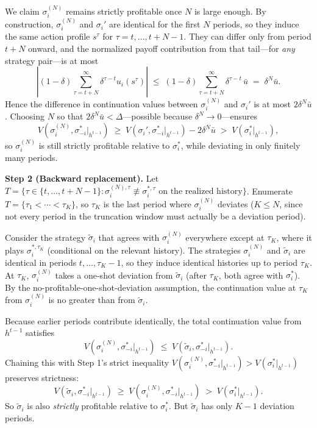 {\begin{center}
\end{center}

We claim $\sigma_i^{(N)}$ remains strictly profitable once $N$ is large enough. By construction, $\sigma_i^{(N)}$ and $\sigma_i'$ are identical for the first $N$ periods, so they induce the same action profile $s^\tau$ for $\tau = t, \ldots, t+N-1$. They can differ only from period $t+N$ onward, and the normalized payoff contribution from that tail---for \emph{any} strategy pair---is at most
\[
\left|(1-\delta)\sum_{\tau = t+N}^{\infty} \delta^{\tau - t} u_i(s^\tau)\right| \;\le\; (1-\delta)\sum_{\tau = t+N}^{\infty}\delta^{\tau-t}\,\bar u \;=\; \delta^N \bar u.
\]
Hence the difference in continuation values between $\sigma_i^{(N)}$ and $\sigma_i'$ is at most $2\delta^N \bar u$. Choosing $N$ so that $2\delta^N \bar u < \Delta$---possible because $\delta^N \to 0$---ensures
\[
V(\sigma_i^{(N)}, \sigma_{-i}^*|_{h^{t-1}}) \;\ge\; V(\sigma_i', \sigma_{-i}^*|_{h^{t-1}}) - 2\delta^N \bar u \;>\; V(\sigma_i^*|_{h^{t-1}}),
\]
so $\sigma_i^{(N)}$ is still strictly profitable relative to $\sigma_i^*$, while deviating in only finitely many periods.

\smallskip
\noindent\textbf{Step 2 (Backward replacement).} Let $T = \{\tau \in \{t, \ldots, t + N - 1\} : \sigma_i^{(N), \tau}\not\equiv \sigma_i^{*,\tau}\text{ on the realized history}\}$. Enumerate $T = \{\tau_1 < \cdots < \tau_K\}$, so $\tau_K$ is the last period where $\sigma_i^{(N)}$ deviates ($K \le N$, since not every period in the truncation window must actually be a deviation period).

Consider the strategy $\tilde\sigma_i$ that agrees with $\sigma_i^{(N)}$ everywhere except at $\tau_K$, where it plays $\sigma_i^{*, \tau_K}$ (conditional on the relevant history). The strategies $\sigma_i^{(N)}$ and $\tilde\sigma_i$ are identical in periods $t, \ldots, \tau_K - 1$, so they induce identical histories up to period $\tau_K$. At $\tau_K$, $\sigma_i^{(N)}$ takes a one-shot deviation from $\tilde\sigma_i$ (after $\tau_K$, both agree with $\sigma_i^*$). By the no-profitable-one-shot-deviation assumption, the continuation value at $\tau_K$ from $\sigma_i^{(N)}$ is no greater than from $\tilde\sigma_i$.

Because earlier periods contribute identically, the total continuation value from $h^{t-1}$ satisfies
\[
V(\sigma_i^{(N)}, \sigma_{-i}^*|_{h^{t-1}}) \;\le\; V(\tilde\sigma_i, \sigma_{-i}^*|_{h^{t-1}}).
\]
Chaining this with Step 1's strict inequality $V(\sigma_i^{(N)}, \sigma_{-i}^*|_{h^{t-1}}) > V(\sigma_i^*|_{h^{t-1}})$ preserves strictness:
\[
V(\tilde\sigma_i, \sigma_{-i}^*|_{h^{t-1}}) \;\ge\; V(\sigma_i^{(N)}, \sigma_{-i}^*|_{h^{t-1}}) \;>\; V(\sigma_i^*|_{h^{t-1}}).
\]
So $\tilde\sigma_i$ is also \emph{strictly} profitable relative to $\sigma_i^*$. But $\tilde\sigma_i$ has only $K - 1$ deviation periods.

}
